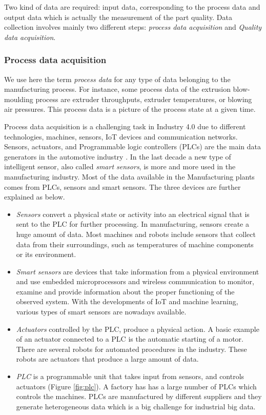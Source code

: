 Two kind of data are required: input data, corresponding to the process data and output data which is actually the measurement of the part quality. Data collection involves mainly two different steps: \textit{process data acquisition} and \textit{Quality data acquisition}. 

\subsubsection{Process data acquisition} \label{Process Data Acquisition}

We use here the term \textit{process data} for any type of data belonging to the manufacturing process. For instance, some process data of the extrusion blow-moulding process are extruder throughputs, extruder temperatures, or blowing air pressures. This process data is a picture of the process state at a given time.

Process data acquisition is a challenging task in Industry 4.0 due to different technologies, machines, sensors, IoT devices and communication networks. Sensors, actuators, and Programmable logic controllers (PLCs) are the main data generators in the automotive industry \citep{khan2017big}. In the last decade a new type of intelligent sensor, also called \textit{smart sensors}, is more and more used in the manufacturing industry. Most of the data available in the Manufacturing plants comes from PLCs, sensors and smart sensors. The three devices are further explained as below.

\begin{itemize}
    \item \textit{Sensors} convert a physical state or activity into an electrical signal that is sent to the PLC for further processing. In manufacturing, sensors create a huge amount of data. Most machines and robots include sensors that collect data from their surroundings, such as temperatures of machine components or its environment.
    \item \textit{Smart sensors} are devices that take information from a physical environment and use embedded microprocessors and wireless communication to monitor, examine and provide information about the proper functioning of the observed system. With the developments of IoT and machine learning, various types of smart sensors are nowadays available.
    \item \textit{Actuators} controlled by the PLC, produce a physical action. A basic example of an actuator connected to a PLC is the automatic starting of a motor. There are several robots for automated procedures in the industry. These robots are actuators that produce a large amount of data.
    \item \textit{PLC} is a programmable unit that takes input from sensors, and controls actuators (Figure \ref{fig:plc}). A factory has has a large number of PLCs which controls the machines. PLCs are manufactured by different suppliers and they generate heterogeneous data which is a big challenge for industrial big data.
\end{itemize}

